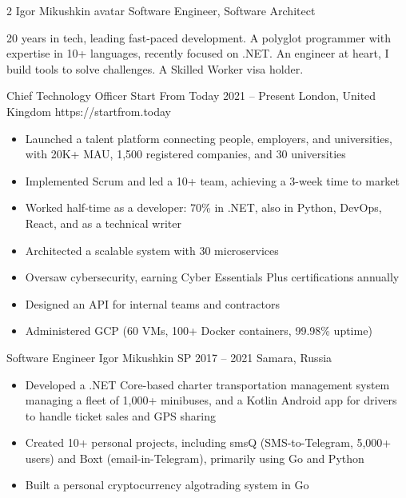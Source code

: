 \documentclass[9pt,a4paper]{igrmkcv}
\begin{document}
\begin{paracol}{2}
\cvMakeHeader
    {Igor Mikushkin}
    {avatar}
    {Software Engineer, Software Architect}

    20 years in tech, leading fast-paced development.
    A polyglot programmer with expertise in 10+ languages, recently focused on .NET.
    An engineer at heart, I build tools to solve challenges.
    A Skilled Worker visa holder.

    \cvLeftEvent
        {Chief Technology Officer}
        {Start From Today}
        {2021 -- Present}
        {London, United Kingdom}
        {https://startfrom.today}

        \begin{itemize}
            \item Launched a talent platform connecting people, employers, and universities,
                  with 20K+ MAU, 1,500 registered companies, and 30 universities
            \item Implemented Scrum and led a 10+ team,
                  achieving a 3-week time to market
            \item Worked half-time as a developer: 70\% in .NET,
                  also in Python, DevOps, React, and as a technical writer
            \item Architected a scalable system with 30 microservices
            \item Oversaw cybersecurity, earning Cyber Essentials Plus certifications annually
            \item Designed an API for internal teams and contractors
            \item Administered GCP (60 VMs, 100+ Docker containers, 99.98\% uptime)
        \end{itemize}

    \cvLeftEvent
        {Software Engineer}
        {Igor Mikushkin SP}
        {2017 -- 2021}
        {Samara, Russia}
        {}

        \begin{itemize}
            \item Developed a .NET Core-based charter transportation management system
                  managing a fleet of 1,000+ minibuses,
                  and a Kotlin Android app for drivers to handle ticket sales and GPS sharing
            \item Created 10+ personal projects,
                  including smsQ (SMS-to-Telegram, 5,000+ users)
                  and Boxt (email-in-Telegram), primarily using Go and Python
            \item Built a personal cryptocurrency algotrading system in Go
        \end{itemize}


\end{paracol}
\end{document}
